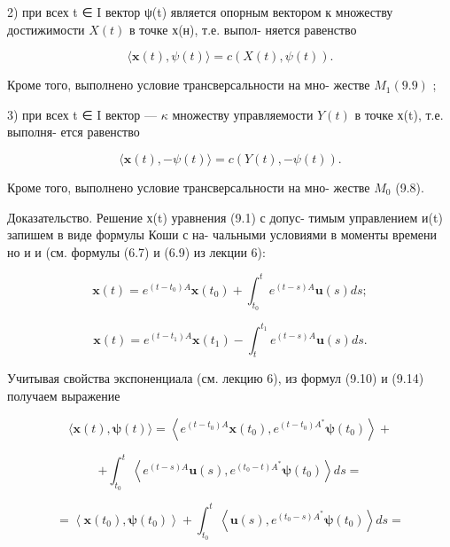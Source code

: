 \documentclass[8pt]{extarticle}
\begin{document}
2) при всех t ∈ I вектор ψ(t) является опорным вектором к множеству достижимости \(X\left( t\right)\) в точке х(н), т.е. выпол- няется равенство

\[
\langle \mathbf{x}\left( t\right) ,\psi \left( t\right) \rangle  = c\left( {X\left( t\right) ,\psi \left( t\right) }\right) . \tag{9.12}
\]

Кроме того, выполнено условие трансверсальности на мно- жестве \({M}_{1}\left( {9.9}\right)\) ;

3) при всех t ∈ I вектор — \(\kappa\) множеству управляемости \(Y\left( t\right)\) в точке х(t), т.е. выполня- ется равенство

\[
\langle \mathbf{x}\left( t\right) , - \psi \left( t\right) \rangle  = c\left( {Y\left( t\right) , - \psi \left( t\right) }\right) . \tag{9.13}
\]

Кроме того, выполнено условие трансверсальности на мно- жестве \({M}_{0}\) (9.8).

Доказательство. Решение х(t) уравнения (9.1) с допус- тимым управлением и(t) запишем в виде формулы Коши с на- чальными условиями в моменты времени но и и (см. формулы (6.7) и (6.9) из лекции 6):

\[
\mathbf{x}\left( t\right)  = {e}^{\left( {t - {t}_{0}}\right) A}\mathbf{x}\left( {t}_{0}\right)  + {\int }_{{t}_{0}}^{t}{e}^{\left( {t - s}\right) A}\mathbf{u}\left( s\right) {ds}; \tag{9.14}
\]

\[
\mathbf{x}\left( t\right)  = {e}^{\left( {t - {t}_{1}}\right) A}\mathbf{x}\left( {t}_{1}\right)  - {\int }_{t}^{{t}_{1}}{e}^{\left( {t - s}\right) A}\mathbf{u}\left( s\right) {ds}. \tag{9.15}
\]

Учитывая свойства экспоненциала (см. лекцию 6), из формул (9.10) и (9.14) получаем выражение

\[
\langle \mathbf{x}\left( t\right) ,\mathbf{\psi }\left( t\right) \rangle  = \left\langle  {{e}^{\left( {t - {t}_{0}}\right) A}\mathbf{x}\left( {t}_{0}\right) ,{e}^{\left( {t - {t}_{0}}\right) {A}^{ * }}\mathbf{\psi }\left( {t}_{0}\right) }\right\rangle   +
\]

\[
+ {\int }_{{t}_{0}}^{t}\left\langle  {{e}^{\left( {t - s}\right) A}\mathbf{u}\left( s\right) ,{e}^{\left( {{t}_{0} - t}\right) {A}^{ * }}\mathbf{\psi }\left( {t}_{0}\right) }\right\rangle  {ds} =
\]

\[
= \left\langle  {\mathbf{x}\left( {t}_{0}\right) ,\mathbf{\psi }\left( {t}_{0}\right) }\right\rangle   + {\int }_{{t}_{0}}^{t}\left\langle  {\mathbf{u}\left( s\right) ,{e}^{\left( {{t}_{0} - s}\right) {A}^{ * }}\mathbf{\psi }\left( {t}_{0}\right) }\right\rangle  {ds} =
\]
\end{document}
